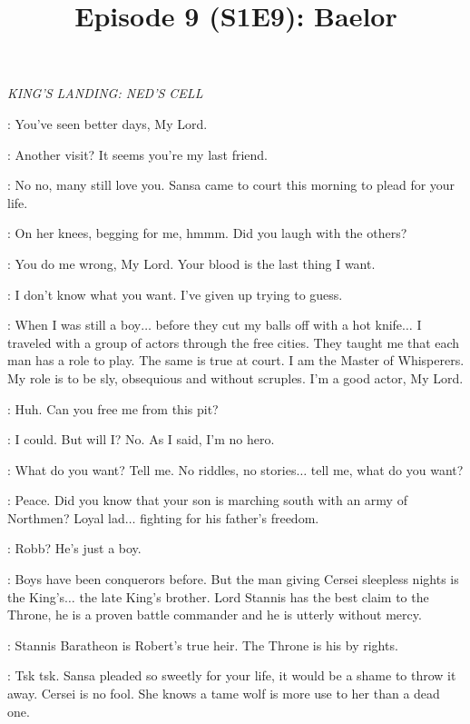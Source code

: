 

\title{Episode 9 (S1E9): Baelor}
\author{}
\date{}
\maketitle




\scene

\textit{KING'S LANDING: NED'S CELL} 


\VARYS: You've seen better days, My Lord. 

\NED: Another visit? It seems you're my last friend. 

\VARYS: No no, many still love you. Sansa came to court this morning to plead for your life. 

\NED: On her knees, begging for me, hmmm. Did you laugh with the others? 

\VARYS: You do me wrong, My Lord. Your blood is the last thing I want. 

\NED: I don't know what you want. I've given up trying to guess. 

\VARYS: When I was still a boy$\ldots$ before they cut my balls off with a hot knife$\ldots$  I traveled with a group of actors through the free cities. They taught me that each man has a role to play. The same is true at court. I am the Master of Whisperers. My role is to be sly, obsequious and without scruples. I'm a good actor, My Lord. 

\NED: Huh. Can you free me from this pit? 

\VARYS: I could. But will I? No. As I said, I'm no hero. 

\NED: What do you want? Tell me. No riddles, no stories$\ldots$ tell me, what do you want? 

\VARYS: Peace. Did you know that your son is marching south with an army of Northmen? Loyal lad$\ldots$ fighting for his father's freedom. 

\NED: Robb? He's just a boy. 

\VARYS: Boys have been conquerors before. But the man giving Cersei sleepless nights is the King's$\ldots$ the late King's brother. Lord Stannis has the best claim to the Throne, he is a proven battle commander and he is utterly without mercy. 

\NED: Stannis Baratheon is Robert's true heir. The Throne is his by rights. 

\VARYS: Tsk tsk. Sansa pleaded so sweetly for your life, it would be a shame to throw it away. Cersei is no fool. She knows a tame wolf is more use to her than a dead one. 

